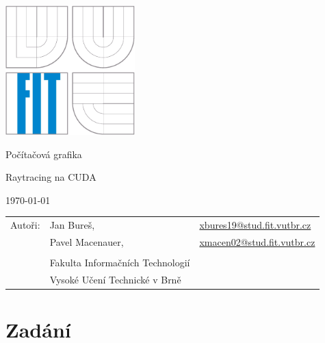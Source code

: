 \documentclass[12pt,a4paper,titlepage,final]{report}
\makeatletter
\newcommand\Course{Počítačová grafika}
\newcommand\WorkTitle{Raytracing na CUDA}
\newcommand\AuthorA{Jan Bureš}
\newcommand\AuthorAEmail{xbures19@stud.fit.vutbr.cz}
\newcommand\AuthorB{Pavel Macenauer}
\newcommand\AuthorBEmail{xmacen02@stud.fit.vutbr.cz}
\newcommand\Faculty{Fakulta Informačních Technologií}
\newcommand\School{Vysoké Učení Technické v Brně}
\makeatother
\begin{document}
	\begin{titlepage}
	\begin{center}
		\includegraphics[height=5cm]{images/logo.eps}
	\end{center}
	\vfill
	\begin{center}
		\begin{Large}
			\Course\\
		\end{Large}
		\bigskip
		\begin{Huge}
			\WorkTitle\\
		\end{Huge}
	\end{center}
	\vfill
	\begin{center}
		\begin{large}
			\today
		\end{large}
	\end{center}
	\vfill
	\begin{flushleft}
		\begin{large}
			\begin{tabular}{lll}
				Autoři: & \AuthorA, & \url{\AuthorAEmail} \\
				        & \AuthorB, & \url{\AuthorBEmail} \\
				& & \\
				& \Faculty \\
				& \School \\
			\end{tabular}
		\end{large}
	\end{flushleft}
\end{titlepage}		
	
	
\tableofcontents

\newpage
\chapter{Zadání}
\end{document}
